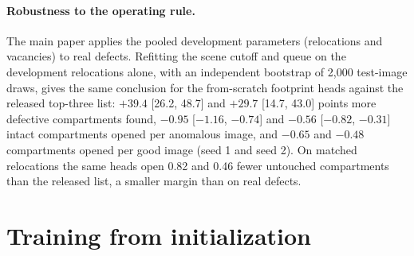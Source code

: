 \paragraph{Robustness to the operating rule.} The main paper applies the pooled development parameters (relocations and vacancies) to real defects. Refitting the scene cutoff and queue on the development relocations alone, with an independent bootstrap of 2{,}000 test-image draws, gives the same conclusion for the from-scratch footprint heads against the released top-three list: $+39.4$ [26.2, 48.7] and $+29.7$ [14.7, 43.0] points more defective compartments found, $-0.95$ [$-1.16$, $-0.74$] and $-0.56$ [$-0.82$, $-0.31$] intact compartments opened per anomalous image, and $-0.65$ and $-0.48$ compartments opened per good image (seed 1 and seed 2). On matched relocations the same heads open 0.82 and 0.46 fewer untouched compartments than the released list, a smaller margin than on real defects.



\begin{table}[t]
\centering
\caption{Real pushpin defects at development-fixed operating points: recall of defective compartments, intact compartments opened per anomalous image, compartments opened per good image, and scene alarm rates.}
\label{tab:native_op}
\footnotesize\setlength{\tabcolsep}{4pt}

\end{table}

\section{Training from initialization}
\label{sec:supp_scratch}


